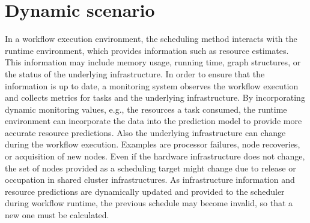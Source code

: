 \documentclass[conference]{IEEEtran}
\newcommand{\AB}[1]{{\color{purple}[AB: #1]}}
\begin{document}
%
%
%
%
%
%



\section{Dynamic scenario}
\label{sec:dyn}
%
In a workflow execution environment, the scheduling method interacts with the runtime environment, which provides information such as resource estimates.
This information may include memory usage, running time, graph structures, or the status of the underlying infrastructure.
In order to ensure that the information is up to date, a monitoring system observes the workflow execution and collects metrics for tasks and the underlying infrastructure.
By incorporating dynamic monitoring values, e.g., the resources a task consumed, the runtime environment can incorporate the data into the prediction model to provide more accurate resource predictions.
Also the underlying infrastructure can change during the workflow execution.
Examples are processor failures, node recoveries, or acquisition of new nodes.
Even if the hardware infrastructure does not change, the set of nodes provided as a scheduling target might change due to release or occupation in shared cluster infrastructures.
As infrastructure information and resource predictions are dynamically updated and provided to the scheduler during workflow runtime, the previous schedule may become invalid, so that a new one must be calculated.
\end{document}
